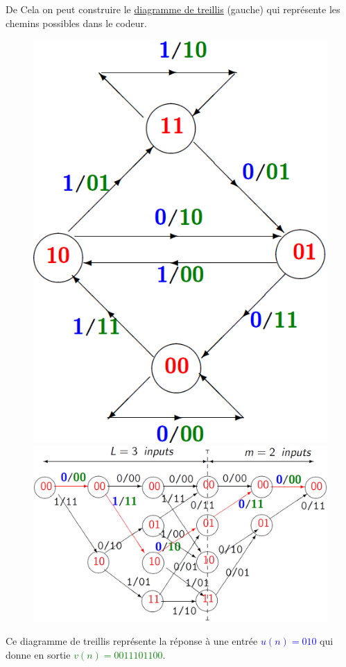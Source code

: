 De Cela on peut construire le \underline{diagramme de treillis} (gauche) qui représente les chemins
possibles dans le codeur.
\begin{figure}[H]
    \begin{minipage}{0.15\textwidth}
        \includegraphics[width=\linewidth]{images/conv_coding_encoder_state_diagram_2.png}
    \end{minipage}%
    \begin{minipage}{0.35\textwidth}
        \includegraphics[width=\linewidth]{images/conv_coding_treillis_diagram_2.png}
    \end{minipage}
\end{figure}
Ce diagramme de treillis représente la réponse à une entrée \textcolor{blue}{$u(n)=010$} qui donne en sortie
\textcolor{green}{$v(n)=0011101100$}.

